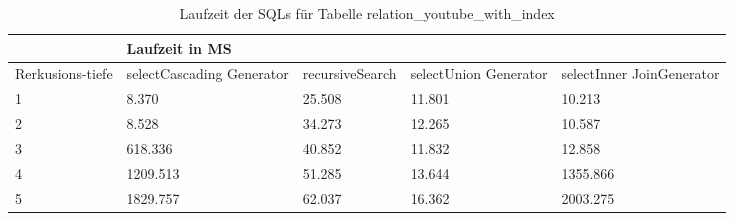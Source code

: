 \begin{table}[H]
	\centering
	\begin{tabular}{l|l|l|l|l|l|}
		\cline{2-6}
		& \multicolumn{5}{|l|}{Laufzeit in MS}                                                                                                                                                  \\ \hline
		\multicolumn{1}{|l|}{\multirow{2}{2cm}{Rerkusions-tiefe}} & \multicolumn{2}{|l|}{\multirow{2}{3cm}{selectCascading Generator}} & \multirow{2}{2.8cm}{recursiveSearch} & \multirow{2}{2.5cm}{selectUnion Generator} & \multirow{2}{2.5cm}{selectInner JoinGenerator} \\
		\multicolumn{1}{|l|}{}
		& \multicolumn{2}{|l|}{}                                           &                                  &                                     &                                           \\ \hline
		
		\multicolumn{1}{|l|}{1}                                 & \multicolumn{2}{l|}{8.370}                                       & 25.508                                                & 11.801                                                    & 10.213                                                          \\ \hline
		\multicolumn{1}{|l|}{2}                                 & \multicolumn{2}{l|}{8.528}                                       & 34.273                                                & 12.265                                                    & 10.587                                                          \\ \hline
		\multicolumn{1}{|l|}{3}                                 & \multicolumn{2}{l|}{618.336}                                     & 40.852                                                & 11.832                                                    & 12.858                                                          \\ \hline
		\multicolumn{1}{|l|}{4}                                 & \multicolumn{2}{l|}{1209.513}                                    & 51.285                                                & 13.644                                                    & 1355.866                                                        \\ \hline
		\multicolumn{1}{|l|}{5}                                 & \multicolumn{2}{l|}{1829.757}                                    & 62.037                                                & 16.362                                                    & 2003.275                                                        \\ \hline
		
		
	\end{tabular}
	\caption{Laufzeit der SQLs für Tabelle relation\_youtube\_with\_index}
\end{table}

